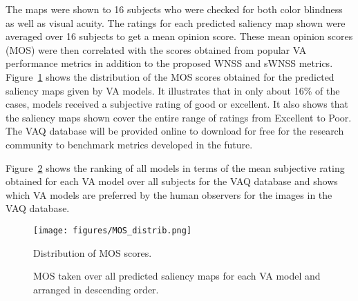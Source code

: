 \documentclass[12pt,onecolumn,journal,	draftclsnofoot]{IEEEtran}
\newlength\figureheight
\newlength\figurewidth
\begin{document}
 The maps were shown to 16 subjects  who were checked for both color blindness as well as visual acuity.  The ratings for each predicted saliency map shown were averaged over 16 subjects to get a mean opinion score. These mean opinion scores (MOS) were then correlated with the scores obtained from popular VA performance metrics in addition to the proposed WNSS and sWNSS metrics.  Figure~\ref{fig:scoreDist} shows the distribution of the MOS scores obtained for the predicted saliency maps given by VA models. It illustrates that in only about 16\% of the cases, models received a subjective rating of good or excellent. It also shows that the saliency maps shown cover the entire range of ratings from Excellent to Poor.   The VAQ database will be provided online to download for free for the research community to benchmark metrics developed in the future. 

Figure~\ref{fig:OverallMOS}  shows the ranking of all models in terms of the mean subjective rating obtained for each VA model over all subjects for the VAQ database and shows which VA models are preferred by the human observers for the images in the VAQ database.  
\begin{figure}[t]
	\centering
	\texttt{[image: figures/MOS\_distrib.png]}
	\caption{Distribution of MOS scores.}
	\label{fig:scoreDist}
\end{figure}
\begin{figure}[t]
	\centering
	\setlength{\figureheight}{0.5\linewidth}
	\setlength{\figurewidth}{0.6\linewidth}
	
	\caption{MOS taken over all predicted saliency maps for each VA model and arranged in descending order.}
	\label{fig:OverallMOS}
\end{figure} 
\end{document}
